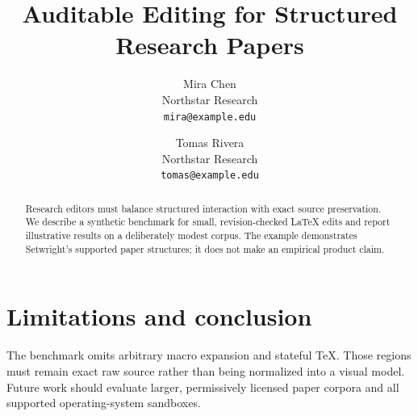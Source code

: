 \documentclass[11pt]{article}
\title{Auditable Editing for Structured Research Papers}
\author{
  Mira Chen \\ Northstar Research \\ \texttt{mira@example.edu}
  \and
  Tomas Rivera \\ Northstar Research \\ \texttt{tomas@example.edu}
}
\date{}
\begin{document}
\maketitle

\begin{abstract}
Research editors must balance structured interaction with exact source
preservation. We describe a synthetic benchmark for small, revision-checked
LaTeX edits and report illustrative results on a deliberately modest corpus.
The example demonstrates Setwright's supported paper structures; it does not
make an empirical product claim.
\end{abstract}





\section{Limitations and conclusion}
\label{sec:conclusion}

The benchmark omits arbitrary macro expansion and stateful TeX. Those regions
must remain exact raw source rather than being normalized into a visual model.
Future work should evaluate larger, permissively licensed paper corpora and all
supported operating-system sandboxes.



\end{document}

